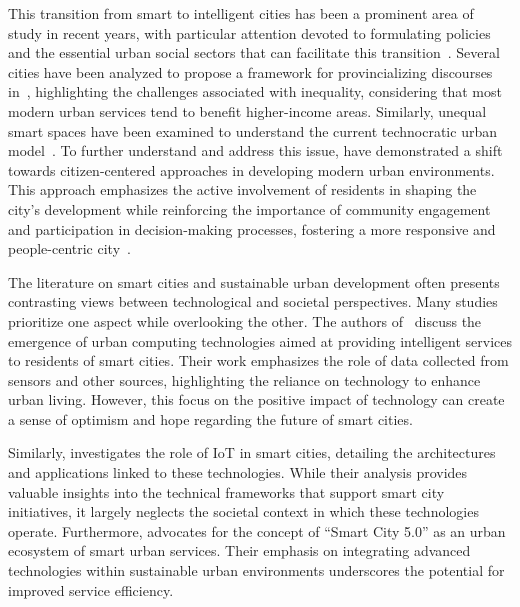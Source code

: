 \documentclass[smartcities,article,submit,pdftex,moreauthors]{Definitions/mdpi}
\begin{document}
This transition from smart to intelligent cities has been a prominent area of study in recent years, with particular attention devoted to formulating policies and the essential urban social sectors that can facilitate this transition~\cite{Razmjoo2022}. Several cities have been analyzed to propose a framework for provincializing discourses in~\cite{Irazabal2020}, highlighting the challenges associated with inequality, considering that most modern urban services tend to benefit higher-income areas. Similarly, unequal smart spaces have been examined to understand the current technocratic urban model~\cite{Kraus2022}. To further understand and address this issue, \cite{Baltac2019} have demonstrated a shift towards citizen-centered approaches in developing modern urban environments. This approach emphasizes the active involvement of residents in shaping the city's development while reinforcing the importance of community engagement and participation in decision-making processes, fostering a more responsive and people-centric city~\cite{Ilhami2022,suryawanSmartUrbanismCitizencentric2024}. 

The literature on smart cities and sustainable urban development often presents contrasting views between technological and societal perspectives. Many studies prioritize one aspect while overlooking the other. The authors of~\cite{hashemUrbanComputingSustainable2023} discuss the emergence of urban computing technologies aimed at providing intelligent services to residents of smart cities. Their work emphasizes the role of data collected from sensors and other sources, highlighting the reliance on technology to enhance urban living. However, this focus on the positive impact of technology can create a sense of optimism and hope regarding the future of smart cities. 

Similarly, \cite{ketuContemporarySurveyIoT2022} investigates the role of IoT in smart cities, detailing the architectures and applications linked to these technologies. While their analysis provides valuable insights into the technical frameworks that support smart city initiatives, it largely neglects the societal context in which these technologies operate. Furthermore, \cite{svitekSmartCityUrban2020} advocates for the concept of ``Smart City 5.0'' as an urban ecosystem of smart urban services. Their emphasis on integrating advanced technologies within sustainable urban environments underscores the potential for improved service efficiency. 
\end{document}
